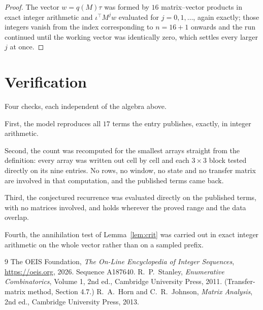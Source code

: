 \documentclass[11pt,a4paper]{article}
\theoremstyle{plain}
\theoremstyle{definition}
\begin{document}
\begin{proof}
The vector $w=q(M)\tau$ was formed by $16$ matrix--vector products in exact integer
arithmetic and $\iota^{\!\top}M^{j}w$ evaluated for $j=0,1,\dots$, again exactly; those
integers vanish from the index corresponding to $n=16+1$ onwards and the run continued
until the working vector was identically zero, which settles every larger $j$ at once.
\end{proof}

\section{Verification}

Four checks, each independent of the algebra above.

First, the model reproduces all $17$ terms the entry publishes, exactly, in integer
arithmetic.

Second, the count was recomputed for the smallest arrays straight from the definition: every
array was written out cell by cell and each $3\times3$ block tested directly on its nine
entries. No rows, no window, no state and no transfer matrix are involved in that computation,
and the published terms came back.

Third, the conjectured recurrence was evaluated directly on the published terms, with no
matrices involved, and holds wherever the proved range and the data overlap.

Fourth, the annihilation test of Lemma~\ref{lem:crit} was carried out in exact integer
arithmetic on the whole vector rather than on a sampled prefix.

\begin{thebibliography}{9}
 The OEIS Foundation, \emph{The On-Line Encyclopedia of Integer
Sequences}, \url{https://oeis.org}, 2026. Sequence A187640.
 R.~P.~Stanley, \emph{Enumerative Combinatorics}, Volume 1, 2nd ed.,
Cambridge University Press, 2011. (Transfer-matrix method, Section 4.7.)
 R.~A.~Horn and C.~R.~Johnson, \emph{Matrix Analysis}, 2nd ed., Cambridge
University Press, 2013.
\end{thebibliography}
\end{document}
